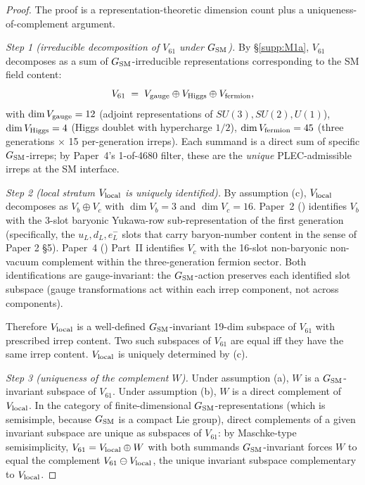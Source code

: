 \documentclass[11pt]{article}
\theoremstyle{plain}
\theoremstyle{definition}
\theoremstyle{remark}
\newcommand{\paperref}[2]{Paper~#1 (\emph{#2})}
\begin{document}
\begin{proof}
The proof is a representation-theoretic dimension count plus a uniqueness-of-complement argument.

\medskip

\emph{Step 1 (irreducible decomposition of $V_{61}$ under $G_{\rm SM}$).}  By \S\ref{supp:M1a}, $V_{61}$ decomposes as a sum of $G_{\rm SM}$-irreducible representations corresponding to the SM field content:
\[
  V_{61} \;=\; V_{\rm gauge} \oplus V_{\rm Higgs} \oplus V_{\rm fermion},
\]
with $\dim V_{\rm gauge} = 12$ (adjoint representations of $SU(3), SU(2), U(1)$), $\dim V_{\rm Higgs} = 4$ (Higgs doublet with hypercharge $1/2$), $\dim V_{\rm fermion} = 45$ (three generations × 15 per-generation irreps).  Each summand is a direct sum of specific $G_{\rm SM}$-irreps; by Paper~4's 1-of-4680 filter, these are the \emph{unique} PLEC-admissible irreps at the SM interface.

\medskip

\emph{Step 2 (local stratum $V_{\rm local}$ is uniquely identified).}  By assumption (c), $V_{\rm local}$ decomposes as $V_b \oplus V_c$ with $\dim V_b = 3$ and $\dim V_c = 16$.  \paperref{2}{} identifies $V_b$ with the 3-slot baryonic Yukawa-row sub-representation of the first generation (specifically, the $u_L, d_L, e^-_L$ slots that carry baryon-number content in the sense of Paper 2 \S5).  \paperref{4}{} Part~II identifies $V_c$ with the 16-slot non-baryonic non-vacuum complement within the three-generation fermion sector.  Both identifications are gauge-invariant: the $G_{\rm SM}$-action preserves each identified slot subspace (gauge transformations act within each irrep component, not across components).

Therefore $V_{\rm local}$ is a well-defined $G_{\rm SM}$-invariant 19-dim subspace of $V_{61}$ with prescribed irrep content.  Two such subspaces of $V_{61}$ are equal iff they have the same irrep content.  $V_{\rm local}$ is uniquely determined by (c).

\medskip

\emph{Step 3 (uniqueness of the complement $W$).}  Under assumption (a), $W$ is a $G_{\rm SM}$-invariant subspace of $V_{61}$.  Under assumption (b), $W$ is a direct complement of $V_{\rm local}$.  In the category of finite-dimensional $G_{\rm SM}$-representations (which is semisimple, because $G_{\rm SM}$ is a compact Lie group), direct complements of a given invariant subspace are unique as subspaces of $V_{61}$: by Maschke-type semisimplicity, $V_{61} = V_{\rm local} \oplus W$ with both summands $G_{\rm SM}$-invariant forces $W$ to equal the complement $V_{61} \ominus V_{\rm local}$, the unique invariant subspace complementary to $V_{\rm local}$.


\end{proof}
\end{document}
